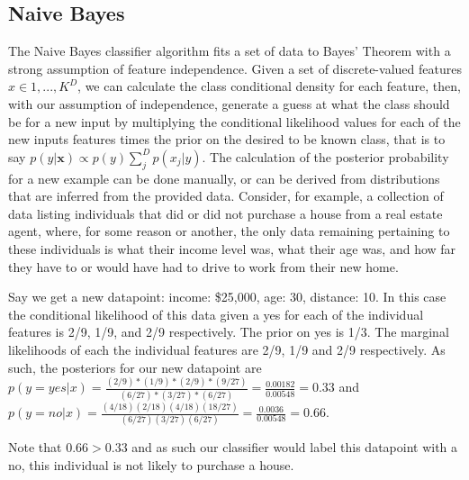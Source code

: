 \subsection{Naive Bayes}
The Naive Bayes classifier algorithm fits a set of data to Bayes' Theorem with a
strong assumption of feature independence. Given a set of discrete-valued
features $x \in {1,...,K}^D$, we can calculate the class conditional density for
each feature, then, with our assumption of independence, generate a guess
at what the class should be for a new input by multiplying the conditional
likelihood values for each of the new inputs features times the prior on the
desired to be known class, that is to say
$p(y|\textbf{x}) \propto p(y) \sum_{j}^{D}p(x_j|y)$.
The calculation of the posterior probability for a new example can be done
manually, or can be derived from distributions that are inferred from the
provided data. Consider, for example, a collection of data listing individuals
that did or did not purchase a house from a real estate agent, where, for some
reason or another, the only data remaining pertaining to these individuals is
what their income level was, what their age was, and how far they have to or
would have had to drive to work from their new home.

Say we get a new datapoint: income: \$25,000, age: 30, distance: 10. In this
case the conditional likelihood of this data given a yes for each of the
individual features is 2/9, 1/9, and 2/9 respectively. The prior on yes is 1/3.
The marginal likelihoods of each the individual features are 2/9, 1/9 and 2/9
respectively. As such, the posteriors for our new datapoint are
$p(y=yes|x)=\frac{(2/9)*(1/9)*(2/9)*(9/27)}{(6/27)*(3/27)*(6/27)} = \frac{0.00182}{0.00548} = 0.33$ and $p(y=no|x)=\frac{(4/18)(2/18)(4/18)(18/27)}{(6/27)(3/27)(6/27)} = \frac{0.0036}{0.00548} = 0.66$.

Note that $0.66 > 0.33$ and as such our classifier would label this datapoint
with a no, this individual is not likely to purchase a house.

